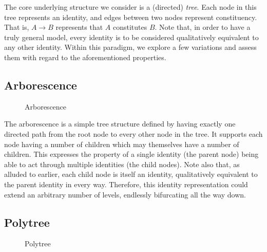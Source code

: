 \documentclass[pra,twocolumn,groupedaddress,10pt]{revtex4}
\theoremstyle{definition}
\begin{document}
The core underlying structure we consider is a (directed) \textit{tree}. Each node in this tree represents an identity, and edges between two nodes represent constituency. That is, $A \rightarrow B$ represents that $A$ constitutes $B$. Note that, in order to have a truly general model, every identity is to be considered qualitatively equivalent to any other identity. Within this paradigm, we explore a few variations and assess them with regard to the aforementioned properties.

\subsection{Arborescence} \label{sec:arborescence}

\begin{figure}[htp]
\centering
{}
\caption{\label{fig:arborescence}Arborescence}
\end{figure}

The arborescence\cite{arborescence} is a simple tree structure defined by having exactly one directed path from the root node to every other node in the tree. It supports each node having a number of children which may themselves have a number of children. This expresses the property of a single identity (the parent node) being able to act through multiple identities (the child nodes). Note also that, as alluded to earlier, each child node is itself an identity, qualitatively equivalent to the parent identity in every way. Therefore, this identity representation could extend an arbitrary number of levels, endlessly bifurcating all the way down.

\subsection{Polytree} \label{sec:polytree}

\begin{figure}[htp]
\centering
{}
\caption{\label{fig:polytree}Polytree}
\end{figure}
\end{document}
